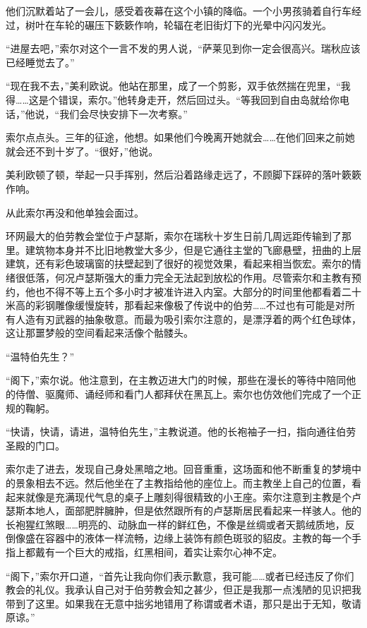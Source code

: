 \documentclass[AutoFakeBold=true]{book}
\begin{document}
他们沉默着站了一会儿，感受着夜幕在这个小镇的降临。一个小男孩骑着自行车经过，树叶在车轮的碾压下簌簌作响，轮辐在老旧街灯下的光晕中闪闪发光。

``进屋去吧，''索尔对这个一言不发的男人说，``萨莱见到你一定会很高兴。瑞秋应该已经睡觉去了。''

``现在我不去，''美利欧说。他站在那里，成了一个剪影，双手依然揣在兜里，``我得……这是个错误，索尔。''他转身走开，然后回过头。``等我回到自由岛就给你电话，''他说，``我们会尽快安排下一次考察。''

索尔点点头。{\kaishu 三年的征途}，他想。{\kaishu 如果他们今晚离开她就会……在他们回来之前她就会还不到十岁了}。``很好，''他说。

美利欧顿了顿，举起一只手挥别，然后沿着路缘走远了，不顾脚下踩碎的落叶簌簌作响。

从此索尔再没和他单独会面过。

\vspace*{1em}

环网最大的伯劳教会堂位于卢瑟斯，索尔在瑞秋十岁生日前几周远距传输到了那里。建筑物本身并不比旧地教堂大多少，但是它通往主堂的飞廊悬壁，扭曲的上层建筑，还有彩色玻璃窗的扶壁起到了很好的视觉效果，看起来相当恢宏。索尔的情绪很低落，何况卢瑟斯强大的重力完全无法起到放松的作用。尽管索尔和主教有预约，他也不得不等上五个多小时才被准许进入内室。大部分的时间里他都看着二十米高的彩钢雕像缓慢旋转，那看起来像极了传说中的伯劳……不过也有可能是对所有人造有刃武器的抽象敬意。而最为吸引索尔注意的，是漂浮着的两个红色球体，这让那噩梦般的空间看起来活像个骷髅头。

``温特伯先生？''

``阁下，''索尔说。他注意到，在主教迈进大门的时候，那些在漫长的等待中陪同他的侍僧、驱魔师、诵经师和看门人都拜伏在黑瓦上。索尔也仿效他们完成了一个正规的鞠躬。

``快请，快请，请进，温特伯先生，''主教说道。他的长袍袖子一扫，指向通往伯劳圣殿的门口。

索尔走了进去，发现自己身处黑暗之地。回音重重，这场面和他不断重复的梦境中的景象相去不远。然后他坐在了主教指给他的座位上。而主教坐上自己的位置，看起来就像是充满现代气息的桌子上雕刻得很精致的小王座。索尔注意到主教是个卢瑟斯本地人，面部肥胖臃肿，但是依然跟所有的卢瑟斯居民看起来一样骇人。他的长袍猩红煞眼……明亮的、动脉血一样的鲜红色，不像是丝绸或者天鹅绒质地，反倒像盛在容器中的液体一样流畅，边缘上装饰有颜色斑驳的貂皮。主教的每一个手指上都戴有一个巨大的戒指，红黑相间，着实让索尔心神不定。

``阁下，''索尔开口道，``首先让我向你们表示歉意，我可能……或者已经违反了你们教会的礼仪。我承认自己对于伯劳教会知之甚少，但正是我那一点浅陋的见识把我带到了这里。如果我在无意中拙劣地错用了称谓或者术语，那只是出于无知，敬请原谅。''
\end{document}
